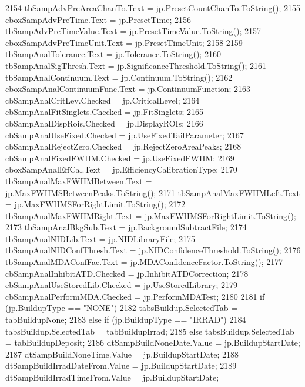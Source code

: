 \begin{DoxyCode}
2154                 tbSampAdvPreAreaChanTo.Text = jp.PresetCountChanTo.ToString();
2155                 cboxSampAdvPreTime.Text = jp.PresetTime;
2156                 tbSampAdvPreTimeValue.Text = jp.PresetTimeValue.ToString();
2157                 cboxSampAdvPreTimeUnit.Text = jp.PresetTimeUnit;
2158 
2159                 tbSampAnalTolerance.Text = jp.Tolerance.ToString();
2160                 tbSampAnalSigThresh.Text = jp.SignificanceThreshold.ToString();
2161                 tbSampAnalContinuum.Text = jp.Continuum.ToString();
2162                 cboxSampAnalContinuumFunc.Text = jp.ContinuumFunction;
2163                 cbSampAnalCritLev.Checked = jp.CriticalLevel;
2164                 cbSampAnalFitSinglets.Checked = jp.FitSinglets;
2165                 cbSampAnalDispRois.Checked = jp.DisplayROIs;
2166                 cbSampAnalUseFixed.Checked = jp.UseFixedTailParameter;
2167                 cbSampAnalRejectZero.Checked = jp.RejectZeroAreaPeaks;
2168                 cbSampAnalFixedFWHM.Checked = jp.UseFixedFWHM;
2169                 cboxSampAnalEffCal.Text = jp.EfficiencyCalibrationType;
2170                 tbSampAnalMaxFWHMBetween.Text = jp.MaxFWHMSBetweenPeaks.ToString();
2171                 tbSampAnalMaxFWHMLeft.Text = jp.MaxFWHMSForRightLimit.ToString();
2172                 tbSampAnalMaxFWHMRight.Text = jp.MaxFWHMSForRightLimit.ToString();
2173                 tbSampAnalBkgSub.Text = jp.BackgroundSubtractFile;
2174                 tbSampAnalNIDLib.Text = jp.NIDLibraryFile;
2175                 tbSampAnalNIDConfThresh.Text = jp.NIDConfidenceThreshold.ToString();
2176                 tbSampAnalMDAConfFac.Text = jp.MDAConfidenceFactor.ToString();
2177                 cbSampAnalInhibitATD.Checked = jp.InhibitATDCorrection;
2178                 cbSampAnalUseStoredLib.Checked = jp.UseStoredLibrary;
2179                 cbSampAnalPerformMDA.Checked = jp.PerformMDATest;
2180 
2181                 \textcolor{keywordflow}{if} (jp.BuildupType == \textcolor{stringliteral}{"NONE"})
2182                     tabsBuildup.SelectedTab = tabBuildupNone;
2183                 \textcolor{keywordflow}{else} \textcolor{keywordflow}{if} (jp.BuildupType == \textcolor{stringliteral}{"IRRAD"})
2184                     tabsBuildup.SelectedTab = tabBuildupIrrad;
2185                 \textcolor{keywordflow}{else} tabsBuildup.SelectedTab = tabBuildupDeposit;
2186                 dtSampBuildNoneDate.Value = jp.BuildupStartDate;
2187                 dtSampBuildNoneTime.Value = jp.BuildupStartDate;
2188                 dtSampBuildIrradDateFrom.Value = jp.BuildupStartDate;
2189                 dtSampBuildIrradTimeFrom.Value = jp.BuildupStartDate;

\end{DoxyCode}
